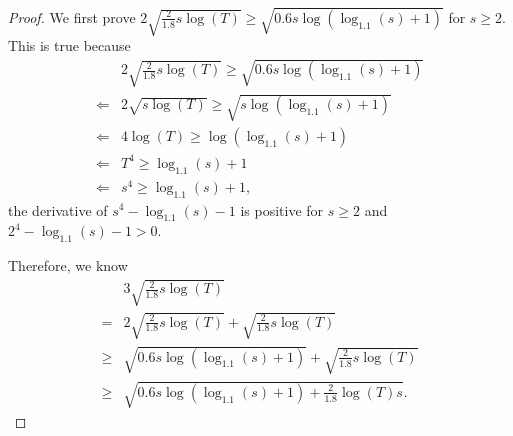 \begin{proof}
We first prove $2\sqrt{\frac{2}{1.8}s\log(T)}\geq \sqrt{0.6s\log(\log_{1.1}(s)+1)}$ for $s\geq 2$. This is true because
\begin{align}
&2\sqrt{\frac{2}{1.8}s\log(T)}\geq \sqrt{0.6s\log(\log_{1.1}(s)+1)} \nonumber \\
\Longleftarrow & 2\sqrt{s\log(T)}\geq \sqrt{s\log(\log_{1.1}(s)+1)} \nonumber \\
\Longleftarrow & 4\log(T)\geq \log(\log_{1.1}(s)+1) \nonumber \\
\Longleftarrow & T^4 \geq \log_{1.1}(s)+1 \nonumber \\
\Longleftarrow & s^4 \geq \log_{1.1}(s)+1, \nonumber
\end{align}
the derivative of $s^4-\log_{1.1}(s)-1$ is positive for $s\geq 2$ and $2^4-\log_{1.1}(s)-1>0$. 

Therefore, we know
\begin{align}
&3\sqrt{\frac{2}{1.8}s\log(T)} \nonumber \\
= & 2\sqrt{\frac{2}{1.8}s\log(T)} + \sqrt{\frac{2}{1.8}s\log(T)} \nonumber \\
\geq & \sqrt{0.6s\log(\log_{1.1}(s)+1)}+\sqrt{\frac{2}{1.8}s\log(T)} \nonumber \\
\geq & \sqrt{0.6s\log(\log_{1.1}(s)+1)+\frac{2}{1.8}\log(T)s}. \nonumber 
\end{align}

\end{proof}
